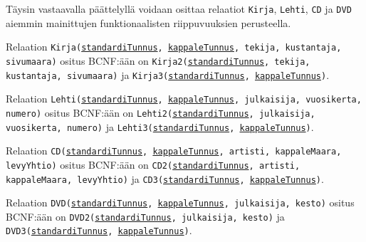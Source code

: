 \documentclass[12pt,titlepage] {article}
\begin{document}
Täysin vastaavalla päättelyllä voidaan osittaa relaatiot \texttt{Kirja}, \texttt{Lehti}, \texttt{CD} ja \texttt{DVD} aiemmin mainittujen funktionaalisten riippuvuuksien perusteella.

Relaation \texttt{Kirja(\underline{standardiTunnus}, \underline{kappaleTunnus}, tekija, kustantaja, sivumaara)} ositus BCNF:ään on \texttt{Kirja2(\underline{standardiTunnus}, tekija, kustantaja, sivumaara)} ja \texttt{Kirja3(\underline{standardiTunnus}, \underline{kappaleTunnus})}.

Relaation \texttt{Lehti(\underline{standardiTunnus}, \underline{kappaleTunnus}, julkaisija, vuosikerta, numero)} ositus BCNF:ään on \texttt{Lehti2(\underline{standardiTunnus}, julkaisija, vuosikerta, numero)} ja \texttt{Lehti3(\underline{standardiTunnus}, \underline{kappaleTunnus})}.

Relaation \texttt{CD(\underline{standardiTunnus}, \underline{kappaleTunnus}, artisti, kappaleMaara, levyYhtio)} ositus BCNF:ään on \texttt{CD2(\underline{standardiTunnus}, artisti, kappaleMaara, levyYhtio)} ja \texttt{CD3(\underline{standardiTunnus}, \underline{kappaleTunnus})}.

Relaation \texttt{DVD(\underline{standardiTunnus}, \underline{kappaleTunnus}, julkaisija, kesto)} ositus BCNF:ään on \texttt{DVD2(\underline{standardiTunnus}, julkaisija, kesto)} ja \texttt{DVD3(\underline{standardiTunnus}, \underline{kappaleTunnus})}.
\end{document}
